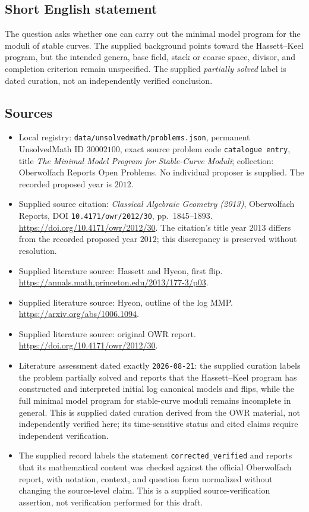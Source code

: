 \documentclass[11pt]{article}
\begin{document}
\subsection{Short English statement}
The question asks whether one can carry out the minimal model program for the moduli of stable curves. The supplied background points toward the Hassett--Keel program, but the intended genera, base field, stack or coarse space, divisor, and completion criterion remain unspecified. The supplied \emph{partially solved} label is dated curation, not an independently verified conclusion.
\subsection{Sources}
\begin{itemize}
\item Local registry: \texttt{data/unsolvedmath/problems.json}, permanent UnsolvedMath ID \(30002100\), exact source problem code \texttt{catalogue entry}, title \emph{The Minimal Model Program for Stable-Curve Moduli}; collection: Oberwolfach Reports Open Problems. No individual proposer is supplied. The recorded proposed year is \(2012\).
\item Supplied source citation: \emph{Classical Algebraic Geometry (2013)}, Oberwolfach Reports, DOI \texttt{10.4171/owr/2012/30}, pp.~1845--1893. \url{https://doi.org/10.4171/owr/2012/30}. The citation's title year \(2013\) differs from the recorded proposed year \(2012\); this discrepancy is preserved without resolution.
\item Supplied literature source: Hassett and Hyeon, first flip. \url{https://annals.math.princeton.edu/2013/177-3/p03}.
\item Supplied literature source: Hyeon, outline of the log MMP. \url{https://arxiv.org/abs/1006.1094}.
\item Supplied literature source: original OWR report. \url{https://doi.org/10.4171/owr/2012/30}.
\item Literature assessment dated exactly \texttt{2026-08-21}: the supplied curation labels the problem partially solved and reports that the Hassett--Keel program has constructed and interpreted initial log canonical models and flips, while the full minimal model program for stable-curve moduli remains incomplete in general. This is supplied dated curation derived from the OWR material, not independently verified here; its time-sensitive status and cited claims require independent verification.
\item The supplied record labels the statement \texttt{corrected\_verified} and reports that its mathematical content was checked against the official Oberwolfach report, with notation, context, and question form normalized without changing the source-level claim. This is a supplied source-verification assertion, not verification performed for this draft.
\end{itemize}
\end{document}

